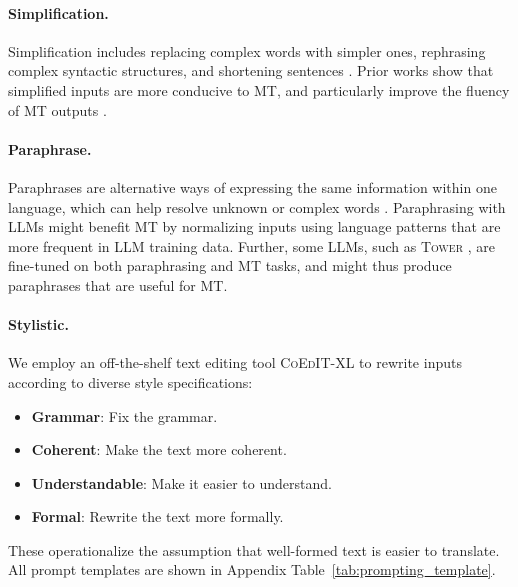 \paragraph{Simplification.}
Simplification includes replacing complex words with simpler ones, rephrasing complex syntactic structures, and shortening sentences \citep{article, Feng2008}. Prior works show that simplified inputs are more conducive to MT, and particularly improve the fluency of MT outputs \citep{stajner-popovic-2019-automated}.

\paragraph{Paraphrase.}
Paraphrases are alternative ways of expressing the same information within one language, which can help resolve unknown or complex words \citep{callison-burch-etal-2006-improved}. Paraphrasing with LLMs might benefit MT by normalizing inputs using language patterns that are more frequent in LLM training data. Further, some LLMs, such as \textsc{Tower} \citep{alves2024tower}, are fine-tuned on both paraphrasing and MT tasks, and might thus produce paraphrases that are useful for MT.

\paragraph{Stylistic.}
We employ an off-the-shelf text editing tool \textsc{CoEdIT-XL} \citep{raheja-etal-2023-coedit} to rewrite inputs according to diverse style specifications:
\begin{itemize}[leftmargin=*, itemsep=2pt, parsep=-1pt]
 \item \textbf{Grammar}: Fix the grammar.
 \item \textbf{Coherent}: Make the text more coherent.
 \item \textbf{Understandable}: Make it easier to understand.
 \item \textbf{Formal}: Rewrite the text more formally.
\end{itemize}
These operationalize the assumption that well-formed text is easier to translate.
All prompt templates are shown in Appendix Table~\ref{tab:prompting_template}.

